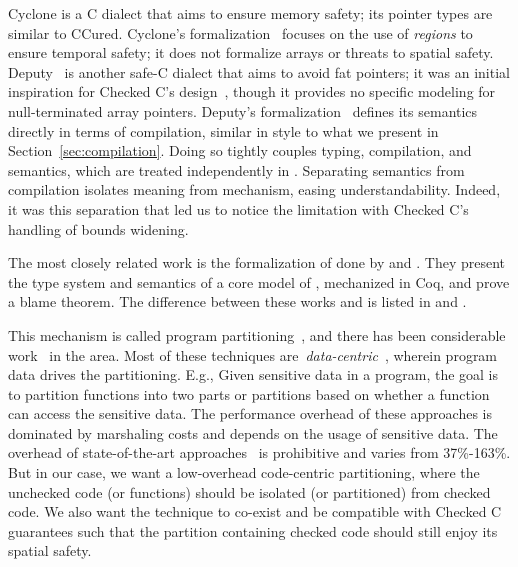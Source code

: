Cyclone \cite{Jim2002,GrossmanMJHWC02} is a C dialect that aims to
ensure memory safety; its pointer types are similar to
CCured. Cyclone's formalization~\cite{GrossmanMJHWC02} focuses on the
use of \emph{regions} to ensure temporal safety; it does not formalize
arrays or threats to spatial safety. Deputy~\cite{Feng2006,Condit2007}
is another safe-C dialect that aims to avoid fat pointers; it was an
initial inspiration for Checked C's design~\cite{Elliott2018}, though
it provides no specific modeling for null-terminated array
pointers. Deputy's formalization~\cite{Condit2007} defines its
semantics directly in terms of compilation, similar in style to what
we present in Section~\ref{sec:compilation}. Doing so tightly couples
typing, compilation, and semantics, which are treated independently in
\lang. Separating semantics from compilation isolates meaning 
from mechanism, easing understandability. Indeed, it was this
separation that led us to notice the 
limitation with Checked C's handling of bounds widening.

The most closely related work is the
formalization of \checkedc done by \citet{ruef18checkedc-incr} and \citet{li22checkedc}. They
present the type system and semantics of a core model of \checkedc,
mechanized in Coq, and prove a blame theorem. 
The difference between these works and \systemname is listed in  and .

%
This mechanism is called program partitioning~\cite{rul2009towards}, and there has been considerable work~\cite{tan2017principles, brumley2004privtrans, bittau2008wedge, lind2017glamdring, liu2017ptrsplit} in the area. Most of these techniques are~\emph{data-centric}~\cite{lind2017glamdring, liu2017ptrsplit}, wherein program data drives the partitioning. E.g., Given sensitive data in a program, the goal is to partition functions into two parts or partitions based on whether a function can access the sensitive data.
The performance overhead of these approaches is dominated by marshaling costs and depends on the usage of sensitive data.
The overhead of state-of-the-art approaches~\cite{lind2017glamdring, liu2017ptrsplit} is prohibitive and varies from 37\%-163\%.
But in our case, we want a low-overhead code-centric partitioning, where the unchecked code (or functions) should be isolated (or partitioned) from checked code. We also want the technique to co-exist and be compatible with Checked C guarantees such that the partition containing checked code should still enjoy its spatial safety.

